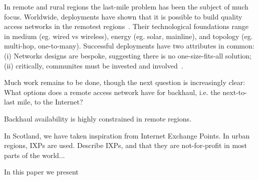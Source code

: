 In remote and rural regions the last-mile problem has been the subject of much
focus. Worldwide, deployments have shown that it is possible to build quality
access networks in the remotest regions~\cite{xxx}. Their technological
foundations range in medium (eg. wired vs wireless), energy (eg. solar,
mainline), and topology (eg. multi-hop, one-to-many). Successful deployments
have two attributes in common: (i) Networks designs are bespoke, suggesting
there is no one-size-fits-all solution; (ii) critically, communites must be
invested and involved~\cite{Wallace:2015a, Wallace2015b}.

Much work remains to be done, though the next question is increasingly clear:
What options does a remote access network have for backhaul, i.e. the
next-to-last mile, to the Internet? 

Backhaul availability is highly constrained in remote regions.

In Scotland, we have taken inspiration from Internet Exchange Points. In urban
regions, IXPs are used. Describe IXPs, and that they are not-for-profit in most
parts of the world...

In this paper we present 